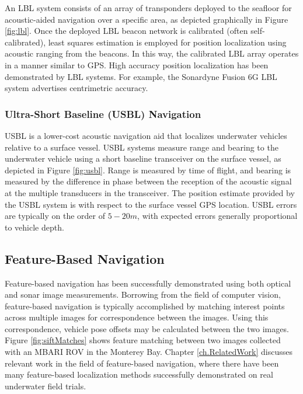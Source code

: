 An LBL system consists of an array of transponders deployed to the seafloor for acoustic-aided navigation over a specific area, as depicted graphically in Figure \ref{fig:lbl}. Once the deployed LBL beacon network is calibrated (often self-calibrated), least squares estimation is employed for position localization using acoustic ranging from the beacons.  In this way, the calibrated LBL array operates in a manner similar to GPS. High accuracy position localization has been demonstrated by LBL systems. For example, the Sonardyne Fusion 6G LBL system advertises centrimetric accuracy.

\subsubsection{Ultra-Short Baseline (USBL) Navigation}
\label{intro.Existing.Acoustic.USBL}

USBL is a lower-cost acoustic navigation aid that localizes underwater vehicles relative to a surface vessel.  USBL systems measure range and bearing to the underwater vehicle using a short baseline transceiver on the surface vessel, as depicted in Figure \ref{fig:usbl}. Range is measured by time of flight, and bearing is measured by the difference in phase between the reception of the acoustic signal at the multiple transducers in the transceiver.  The position estimate provided by the USBL system is with respect to the surface vessel GPS location.  USBL errors are typically on the order of $5-20m$, with expected errors generally proportional to vehicle depth.
 
%

\subsection{Feature-Based Navigation}
\label{intro.Existing.Feature}

Feature-based navigation has been successfully demonstrated using both optical and sonar image measurements.  
Borrowing from the field of computer vision, feature-based navigation is typically accomplished by matching interest points across multiple images for correspondence between the images.  Using this correspondence, vehicle pose offsets may be calculated between the two images.  Figure \ref{fig:siftMatches} shows feature matching between two images collected with an MBARI ROV in the Monterey Bay.
Chapter \ref{ch.RelatedWork} discusses relevant work in the field of feature-based navigation, where there have been many feature-based localization methods successfully demonstrated on real underwater field trials.

